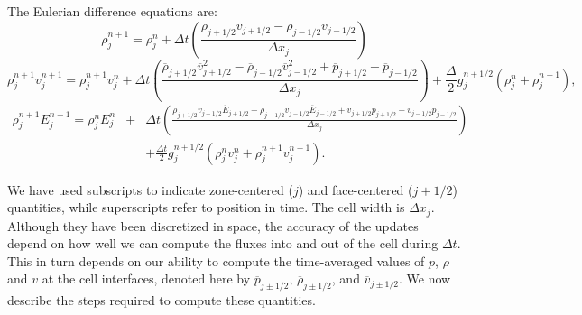 The Eulerian difference equations are:
%
\newcommand{\avp}[1]{\overline{#1}_{j+1/2}}
\newcommand{\avm}[1]{\overline{#1}_{j-1/2}}
\begin{equation}
\rho_j^{n+1} = \rho_j^{n} + \Delta t \left( 
                      \frac{ \avp{\rho}\avp{v} -  \avm{\rho}\avm{v} } {\Delta x_j}
            \right)
     \label{eq:mass_diff}
\end{equation}
\begin{equation}
\rho_j^{n+1} v_{j}^{n+1} =
       \rho_j^{n+1} v_j^n  + \Delta t \left(
          \frac{ \avp{\rho} \avp{v}^2 - \avm{\rho} \avm{v}^2 + \avp{p} - \avm{p}} {\Delta x_j}
             \right)
     + \frac{ \Delta }{2} g_j^{n+1/2} (\rho_j^n + \rho_j^{n+1}), 
     \label{eq:momentum_diff}
\end{equation}
\begin{eqnarray}
\rho_j^{n+1} E_j^{n+1}  = 
       \rho_j^n E_j^n  & + & \Delta t  \left(
            \frac{  \avp{\rho} \avp{v} \avp{E}  - \avm{\rho} \avm{v} \avm{E}  +
                       \avp{v} \avp{p}    - \avm{v} \avm{p} } {\Delta x_j}
             \right) \nonumber \\
         & & + \frac{ \Delta t }{2} g_j^{n+1/2} (\rho_j^n v_j^n + \rho_j^{n+1} v_j^{n+1} ).
     \label{eq:energy_diff}
\end{eqnarray}


We have used subscripts to indicate zone-centered ($j$)
and face-centered ($j+1/2$) quantities, while superscripts refer to
position in time.  The cell width is $\Delta x_j$.
Although they have been discretized
in space, the accuracy of the updates depend on how well we can compute
the fluxes into and out of the cell during $\Delta t$.  
This in turn depends on our ability to compute the time-averaged 
values of $p$, $\rho$ and $v$ at the cell interfaces, denoted here
by $\overline{p}_{j\pm 1/2}$, $\overline{\rho}_{j\pm 1/2}$, and $\overline{v}_{j\pm 1/2}$.  We now
describe the steps required to compute these quantities.

